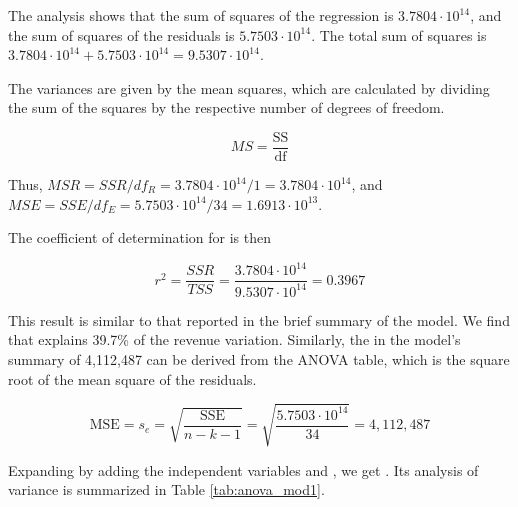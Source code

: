 \bigskip
The analysis shows that the sum of squares of the regression is $3.7804 \cdot 10^{14}$, and the sum of squares of the residuals is $5.7503 \cdot 10^{14}$. The total sum of squares is $3.7804 \cdot 10^{14} + 5.7503 \cdot 10^{14} = 9.5307 \cdot 10^{14}$. 

The variances are given by the mean squares, which are calculated by dividing the sum of the squares by the respective number of degrees of freedom.

\begin{equation}
  MS = \frac{\text{SS}}{\text{df}}
\end{equation}

Thus, $MSR = SSR / df_R = 3.7804 \cdot 10^{14} / 1 = 3.7804 \cdot 10^{14}$, and $MSE = SSE / df_E = 5.7503 \cdot 10^{14} / 34 = 1.6913  \cdot 10^{13}$.

The coefficient of determination for  is then

\begin{equation*}
  r^2 = \frac{SSR}{TSS} = \frac{3.7804 \cdot 10^{14}}{9.5307 \cdot 10^{14}} = 0.3967
\end{equation*}

This result is similar to that reported in the brief summary of the model. We find that  explains 39.7\% of the revenue variation. Similarly, the  in the model's summary of 4,112,487 can be derived from the ANOVA table, which is the square root of the mean square of the residuals.

\begin{equation}
  \text{MSE} = s_e = \sqrt{\frac{\text{SSE}}{n-k-1}} = \sqrt{\frac{5.7503 \cdot 10^{14}}{34}} = 4,112,487
\end{equation}

Expanding  by adding the independent variables  and , we get . Its analysis of variance is summarized in Table \ref{tab:anova_mod1}.

